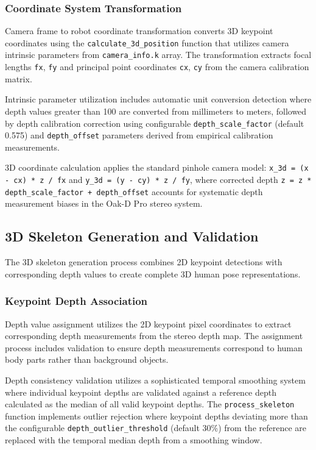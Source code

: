 \subsubsection{Coordinate System Transformation}

Camera frame to robot coordinate transformation converts 3D keypoint coordinates using the \texttt{calculate\_3d\_position} function that utilizes camera intrinsic parameters from \texttt{camera\_info.k} array. The transformation extracts focal lengths \texttt{fx}, \texttt{fy} and principal point coordinates \texttt{cx}, \texttt{cy} from the camera calibration matrix.

Intrinsic parameter utilization includes automatic unit conversion detection where depth values greater than 100 are converted from millimeters to meters, followed by depth calibration correction using configurable \texttt{depth\_scale\_factor} (default 0.575) and \texttt{depth\_offset} parameters derived from empirical calibration measurements.

3D coordinate calculation applies the standard pinhole camera model: \texttt{x\_3d = (x - cx) * z / fx} and \texttt{y\_3d = (y - cy) * z / fy}, where corrected depth \texttt{z = z * depth\_scale\_factor + depth\_offset} accounts for systematic depth measurement biases in the Oak-D Pro stereo system.

\subsection{3D Skeleton Generation and Validation}

The 3D skeleton generation process combines 2D keypoint detections with corresponding depth values to create complete 3D human pose representations.

\subsubsection{Keypoint Depth Association}

Depth value assignment utilizes the 2D keypoint pixel coordinates to extract corresponding depth measurements from the stereo depth map. The assignment process includes validation to ensure depth measurements correspond to human body parts rather than background objects.

Depth consistency validation utilizes a sophisticated temporal smoothing system where individual keypoint depths are validated against a reference depth calculated as the median of all valid keypoint depths. The \texttt{process\_skeleton} function implements outlier rejection where keypoint depths deviating more than the configurable \texttt{depth\_outlier\_threshold} (default 30\%) from the reference are replaced with the temporal median depth from a smoothing window.

